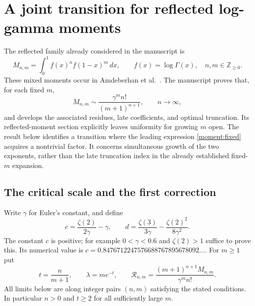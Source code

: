 \section{A joint transition for reflected log-gamma moments}
\label{moment:sec}

The reflected family already considered in the manuscript is
\begin{equation}\label{moment:def}
 M_{n,m}=\int_0^1 f(x)^n f(1-x)^m\,dx,
 \qquad f(x)=\log\Gamma(x),\quad n,m\in\mathbb Z_{\ge0}.
\end{equation}
These mixed moments occur in Amdeberhan et al.~\cite[Section 5]{Amdeberhan2011}.
The manuscript proves that, for each fixed $m$,
\begin{equation}\label{moment:fixed}
 M_{n,m}\sim \frac{\gamma^m n!}{(m+1)^{n+1}},\qquad n\longrightarrow\infty,
\end{equation}
and develops the associated residues, late coefficients, and optimal truncation.
Its reflected-moment section explicitly leaves uniformity for growing $m$ open.
The result below identifies a transition where the leading expression
\eqref{moment:fixed} acquires a nontrivial factor. It concerns simultaneous
growth of the two exponents, rather than the late truncation index in the
already established fixed-$m$ expansion.

\subsection{The critical scale and the first correction}
Write $\gamma$ for Euler's constant, and define
\begin{equation}\label{moment:constants}
 c=\frac{\zeta(2)}{2\gamma}-\gamma,
 \qquad d=\frac{\zeta(3)}{3\gamma}
              -\frac{\zeta(2)^2}{8\gamma^2}.
\end{equation}
The constant $c$ is positive; for example $0<\gamma<0.6$ and
$\zeta(2)>1$ suffice to prove this. Its numerical value is
$c=0.8476712247576688767895678092\ldots$.
For $m\ge1$ put
\begin{equation}\label{moment:parameters}
 t=\frac{n}{m+1},\qquad \lambda=me^{-t},\qquad
 \mathcal R_{n,m}=\frac{(m+1)^{n+1}M_{n,m}}{\gamma^m n!}.
\end{equation}
All limits below are along integer pairs $(n,m)$ satisfying the stated
conditions. In particular $n>0$ and $t\ge2$ for all sufficiently large $m$.

